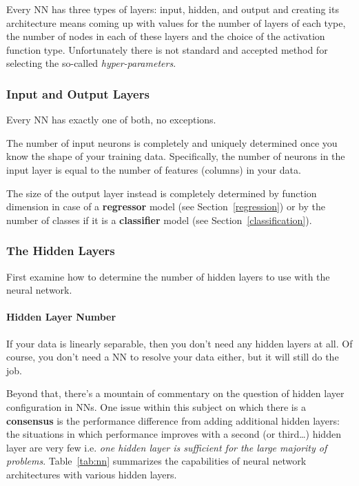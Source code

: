 Every NN has three types of layers: input, hidden, and output and creating its architecture means coming up with values for the number of layers of each type, the number of nodes in each of these layers and the choice of the activation function type.
Unfortunately there is not standard and accepted method for selecting the so-called \emph{hyper-parameters}. 

\subsubsection*{Input and Output Layers}

Every NN has exactly one of both, no exceptions. 

The number of input neurons is completely and uniquely determined once you know the shape of your training data. Specifically, the number of neurons in the input layer is equal to the number of features (columns) in your data. 

The size of the output layer instead is completely determined by function dimension in case of a \textbf{regressor} model (see Section~\ref{regression}) or by the number of classes if it is a \textbf{classifier} model (see Section~\ref{classification}).

\subsubsection*{The Hidden Layers}

First examine how to determine the number of hidden layers to use with the neural network.

\paragraph{Hidden Layer Number}
If your data is linearly separable, then you don't need any hidden layers at all. Of course, you don't need a NN to resolve your data either, but it will still do the job.

Beyond that, there's a mountain of commentary on the question of hidden layer configuration in NNs. One issue within this subject on which there is a \textbf{consensus} is the performance difference from adding additional hidden layers: the situations in which performance improves with a second (or third\ldots) hidden layer are very few i.e. \emph{one hidden layer is sufficient for the large majority of problems}. Table~\ref{tab:nn} summarizes the capabilities of neural network architectures with various hidden layers.

